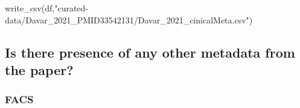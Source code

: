 \documentclass[
]{article}
\newenvironment{Shaded}{\begin{snugshade}}{\end{snugshade}}
\newcommand{\FunctionTok}[1]{\textcolor[rgb]{0.00,0.00,0.00}{#1}}
\newcommand{\NormalTok}[1]{#1}
\newcommand{\StringTok}[1]{\textcolor[rgb]{0.31,0.60,0.02}{#1}}
\providecommand{\tightlist}{%
  \setlength{\itemsep}{0pt}\setlength{\parskip}{0pt}}
\begin{document}
\begin{Shaded}
\begin{Highlighting}[]
\FunctionTok{write\_csv}\NormalTok{(df,}\StringTok{"curated{-}data/Davar\_2021\_PMID33542131/Davar\_2021\_cinicalMeta.csv"}\NormalTok{)}
\end{Highlighting}
\end{Shaded}

\hypertarget{is-there-presence-of-any-other-metadata-from-the-paper}{%
\subsection{Is there presence of any other metadata from the
paper?}\label{is-there-presence-of-any-other-metadata-from-the-paper}}

\hypertarget{facs}{%
\subsubsection{FACS}\label{facs}}

\begin{description}
\tightlist
\item[There are FACS analysis presented.]
\end{description}
\end{document}
